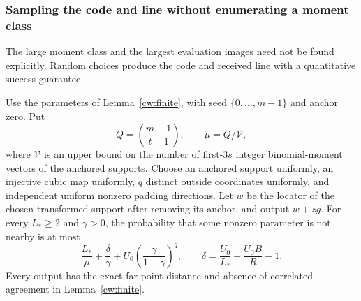 \subsubsection{Sampling the code and line without enumerating a moment class}
\label{sec:cubic-sampling}

The large moment class and the largest evaluation images need not be
found explicitly. Random choices produce the code and received line
with a quantitative success guarantee.

\begin{proposition}
\label{cw:sampling}
Use the parameters of Lemma~\ref{cw:finite}, with seed
$\{0,\ldots,m-1\}$ and anchor zero. Put
\[
 Q=\binom{m-1}{t-1},\qquad
 \mu=Q/\mathcal V,
\]
where $\mathcal V$ is an upper bound on the number of first-$3s$
integer binomial-moment vectors of the anchored supports. Choose an
anchored support uniformly, an injective cubic map uniformly, $q$
distinct outside coordinates uniformly, and independent uniform
nonzero padding directions. Let $w$ be the locator of the chosen
transformed support after removing its anchor, and output $w+zg$.
For every $L_*\ge2$ and $\gamma>0$, the probability that some nonzero
parameter is not nearby is at most
\begin{equation}\label{cw:sampling-failure}
 \frac{L_*}{\mu}+\frac{\delta}{\gamma}
 +U_0\left(\frac{\gamma}{1+\gamma}\right)^q,
 \qquad
 \delta=\frac{U_0}{L_*}+\frac{U_0B}{R}-1.
\end{equation}
Every output has the exact far-point distance and absence of correlated
agreement in Lemma~\ref{cw:finite}.
\end{proposition}
